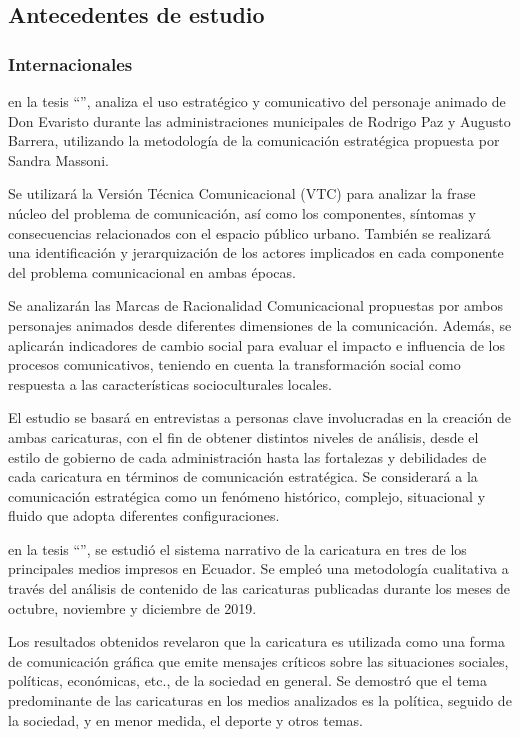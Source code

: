 \documentclass[12pt,a4paper]{article}
\begin{document}
\subsection{Antecedentes de estudio}
\subsubsection{Internacionales}
\cite{zurita_camacho_caricatura_2020} en la tesis  ``'', analiza el uso estratégico y comunicativo del personaje animado de Don Evaristo durante las administraciones municipales de Rodrigo Paz y Augusto Barrera, utilizando la metodología de la comunicación estratégica propuesta por Sandra Massoni.

Se utilizará la Versión Técnica Comunicacional (VTC) para analizar la frase núcleo del problema de comunicación, así como los componentes, síntomas y consecuencias relacionados con el espacio público urbano. También se realizará una identificación y jerarquización de los actores implicados en cada componente del problema comunicacional en ambas épocas.

Se analizarán las Marcas de Racionalidad Comunicacional propuestas por ambos personajes animados desde diferentes dimensiones de la comunicación. Además, se aplicarán indicadores de cambio social para evaluar el impacto e influencia de los procesos comunicativos, teniendo en cuenta la transformación social como respuesta a las características socioculturales locales.

El estudio se basará en entrevistas a personas clave involucradas en la creación de ambas caricaturas, con el fin de obtener distintos niveles de análisis, desde el estilo de gobierno de cada administración hasta las fortalezas y debilidades de cada caricatura en términos de comunicación estratégica. Se considerará a la comunicación estratégica como un fenómeno histórico, complejo, situacional y fluido que adopta diferentes configuraciones.


\cite{segarra_morocho_caricatura_2021} en la tesis ``'', se estudió el sistema narrativo de la caricatura en tres de los principales medios impresos en Ecuador. Se empleó una metodología cualitativa a través del análisis de contenido de las caricaturas publicadas durante los meses de octubre, noviembre y diciembre de 2019.

Los resultados obtenidos revelaron que la caricatura es utilizada como una forma de comunicación gráfica que emite mensajes críticos sobre las situaciones sociales, políticas, económicas, etc., de la sociedad en general. Se demostró que el tema predominante de las caricaturas en los medios analizados es la política, seguido de la sociedad, y en menor medida, el deporte y otros temas.
\end{document}
